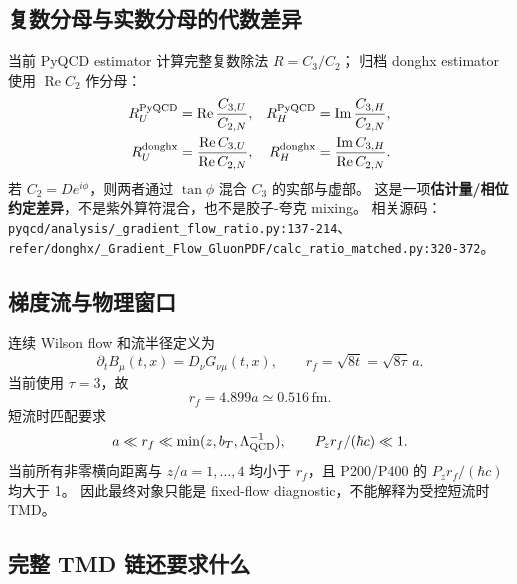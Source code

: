 \documentclass[UTF8]{ctexart}
\newcommand{\pathref}[1]{\texttt{\nolinkurl{#1}}}
\newcommand{\Real}{\operatorname{Re}}
\newcommand{\Imag}{\operatorname{Im}}
\newcommand{\Pz}{P_z}
\begin{document}
\subsection{复数分母与实数分母的代数差异}

当前 PyQCD estimator 计算完整复数除法 \(R=C_3/C_2\)；
归档 donghx estimator 使用 \(\Real C_2\) 作分母：
\begin{align}
R_U^{\rm PyQCD}
&=\Real\frac{C_{3,U}}{C_{2,N}},
&
R_H^{\rm PyQCD}
&=\Imag\frac{C_{3,H}}{C_{2,N}},\\
R_U^{\rm donghx}
&=\frac{\Real C_{3,U}}{\Real C_{2,N}},
&
R_H^{\rm donghx}
&=\frac{\Imag C_{3,H}}{\Real C_{2,N}}.
\label{eq:denominator-conventions}
\end{align}
若 \(C_2=D e^{i\phi}\)，则两者通过 \(\tan\phi\) 混合 \(C_3\) 的实部与虚部。
这是一项\textbf{估计量/相位约定差异}，不是紫外算符混合，也不是胶子-夸克 mixing。
相关源码：
\pathref{pyqcd/analysis/_gradient_flow_ratio.py:137-214}、
\pathref{refer/donghx/_Gradient_Flow_GluonPDF/calc_ratio_matched.py:320-372}。

\subsection{梯度流与物理窗口}

连续 Wilson flow 和流半径定义为
\begin{equation}
\partial_t B_\mu(t,x)=D_\nu G_{\nu\mu}(t,x),
\qquad
r_f=\sqrt{8t}=\sqrt{8\tau}\,a.
\label{eq:flow-radius}
\end{equation}
当前使用 \(\tau=3\)，故
\begin{equation}
r_f=4.899a\simeq0.516\,\mathrm{fm}.
\label{eq:current-rf}
\end{equation}
短流时匹配要求
\begin{equation}
a\ll r_f\ll \min(z,b_T,\Lambda_{\rm QCD}^{-1}),
\qquad
\Pz r_f/(\hbar c)\ll1.
\label{eq:flow-window}
\end{equation}
当前所有非零横向距离与 \(z/a=1,\ldots,4\) 均小于 \(r_f\)，且 P200/P400 的 \(\Pz r_f/(\hbar c)\) 均大于 1。
因此最终对象只能是 fixed-flow diagnostic，不能解释为受控短流时 TMD。

\subsection{完整 TMD 链还要求什么}
\end{document}
